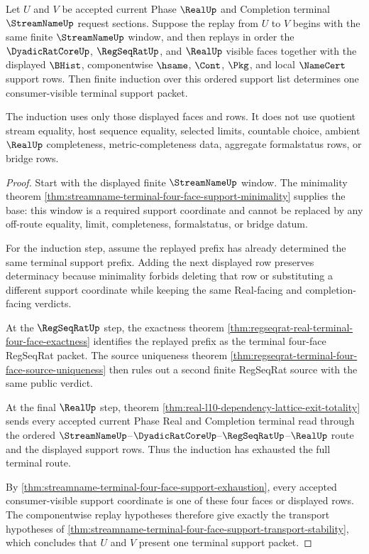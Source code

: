 \begin{theorem}
\label{thm:streamname-terminal-four-face-support-replay-induction}
Let $U$ and $V$ be accepted current Phase $\RealUp$ and Completion terminal
$\StreamNameUp$ request sections. Suppose the replay from $U$ to $V$ begins
with the same finite $\StreamNameUp$ window, and then replays in order the
$\DyadicRatCoreUp$, $\RegSeqRatUp$, and $\RealUp$ visible faces together with
the displayed $\BHist$, componentwise $\hsame$, $\Cont$, $\Pkg$, and local
$\NameCert$ support rows. Then finite induction over this ordered support list
determines one consumer-visible terminal support packet.

The induction uses only those displayed faces and rows. It does not use
quotient stream equality, host sequence equality, selected limits, countable
choice, ambient $\RealUp$ completeness, metric-completeness data, aggregate
formalstatus rows, or bridge rows.
\end{theorem}
\begin{proof}
Start with the displayed finite $\StreamNameUp$ window. The minimality theorem
\autoref{thm:streamname-terminal-four-face-support-minimality} supplies the
base: this window is a required support coordinate and cannot be replaced by
any off-route equality, limit, completeness, formalstatus, or bridge datum.

For the induction step, assume the replayed prefix has already determined the
same terminal support prefix. Adding the next displayed row preserves
determinacy because minimality forbids deleting that row or substituting a
different support coordinate while keeping the same Real-facing and
completion-facing verdicts.

At the $\RegSeqRatUp$ step, the exactness theorem
\autoref{thm:regseqrat-real-terminal-four-face-exactness} identifies the
replayed prefix as the terminal four-face RegSeqRat packet. The source
uniqueness theorem
\autoref{thm:regseqrat-terminal-four-face-source-uniqueness} then rules out a
second finite RegSeqRat source with the same public verdict.

At the final $\RealUp$ step, theorem
\autoref{thm:real-l10-dependency-lattice-exit-totality} sends every accepted
current Phase Real and Completion terminal read through the ordered
$\StreamNameUp$--$\DyadicRatCoreUp$--$\RegSeqRatUp$--$\RealUp$ route and the
displayed support rows. Thus the induction has exhausted the full terminal
route.

By
\autoref{thm:streamname-terminal-four-face-support-exhaustion}, every accepted
consumer-visible support coordinate is one of these four faces or displayed
rows. The componentwise replay hypotheses therefore give exactly the transport
hypotheses of
\autoref{thm:streamname-terminal-four-face-support-transport-stability}, which
concludes that $U$ and $V$ present one terminal support packet.
\end{proof}

